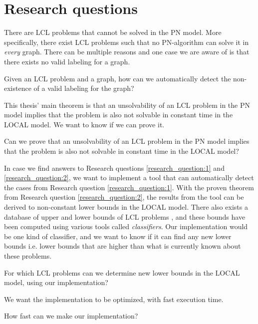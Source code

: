 
\section{Research questions} \label{sec:research_question}

There are LCL problems that cannot be solved in the PN model.
More specifically, there exist LCL problems such that no PN-algorithm can solve it in \emph{every} graph.
There can be multiple reasons and one case we are aware of is that there exists no valid labeling for a graph.
\begin{researchquestion} \label{research_question:1}
Given an LCL problem and a graph, how can we automatically detect the non-existence of a valid labeling for the graph?
\end{researchquestion}

This thesis' main theorem is that an unsolvability of an LCL problem in the PN model implies that the problem is also not solvable in constant time in the LOCAL model.
We want to know if we can prove it.
\begin{researchquestion} \label{research_question:2}
Can we prove that an unsolvability of an LCL problem in the PN model implies that the problem is also not solvable in constant time in the LOCAL model?
\end{researchquestion}

In case we find answers to Research questions \ref{research_question:1} and \ref{research_question:2}, we want to implement a tool that can automatically detect the cases from Research question \ref{research_question:1}.
With the proven theorem from Research question \ref{research_question:2}, the results from the tool can be derived to non-constant lower bounds in the LOCAL model.
There also exists a database of upper and lower bounds of LCL problems \cite{Tereshchenko2021}, and these bounds have been computed using various tools called \emph{classifiers}.
Our implementation would be one kind of classifier, and we want to know if it can find any new lower bounds i.e. lower bounds that are higher than what is currently known about these problems.
\begin{researchquestion} \label{research_question:3}
For which LCL problems can we determine new lower bounds in the LOCAL model, using our implementation?
\end{researchquestion}

We want the implementation to be optimized, with fast execution time.
\begin{researchquestion} \label{research_question:4}
How fast can we make our implementation?
\end{researchquestion}
